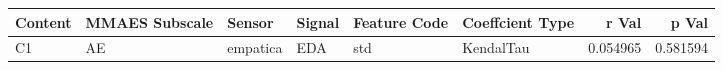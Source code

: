 \begin{tabular}{llllllrr}
\toprule
Content & MMAES Subscale &   Sensor & Signal & Feature Code & Coeffcient Type &    r Val &    p Val \\
\midrule
     C1 &             AE & empatica &    EDA &          std &       KendalTau & 0.054965 & 0.581594 \\
\bottomrule
\end{tabular}
